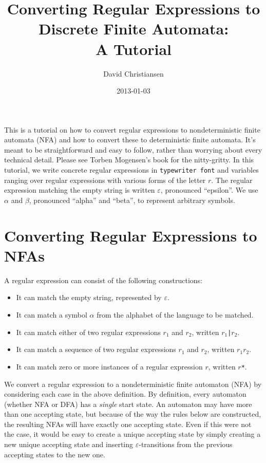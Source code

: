 \documentclass[a4paper]{article}
\title{Converting Regular Expressions to\\ Discrete Finite Automata:\\ A Tutorial}
\author{David Christiansen}
\date{2013-01-03}
\newcommand\eps{\ensuremath{\varepsilon}}
\newcommand{\regex}[1]{\texttt{#1}}
\begin{document}
\maketitle
This is a tutorial on how to convert regular expressions to nondeterministic
finite automata (NFA) and how to convert these to deterministic finite
automata. It's meant to be straightforward and easy to follow, rather than
worrying about every technical detail. Please see Torben Mogensen's book for
the nitty-gritty. In this tutorial, we write concrete regular expressions in
\regex{typewriter font} and variables ranging over regular expressions with
various forms of the letter $r$. The regular expression matching the empty
string is written \eps, pronounced ``epsilon''.  We use $\alpha$ and $\beta$,
pronounced ``alpha'' and ``beta'', to represent arbitrary symbols.


\section*{Converting Regular Expressions to NFAs}
\label{sec:conv-regul-expr}

A regular expression can consist of the following constructions:
\begin{itemize}
\item It can match the empty string, represented by \eps.
\item It can match a symbol $\alpha$ from the alphabet of the language to be matched.
\item It can match either of two regular expressions $r_1$ and $r_2$,
  written \regex{$r_1$|$r_2$}.
\item It can match a sequence of two regular expressions  $r_1$ and $r_2$,
  written \regex{$r_1$$r_2$}.
\item It can match zero or more instances of a regular expression
  $r$, written \regex{$r$*}.
\end{itemize}

We convert a regular expression to a nondeterministic finite automaton
(NFA) by considering each case in the above definition. By definition,
every automaton (whether NFA or DFA) has a \emph{single} start
state. An automaton may have more than one accepting state, but
because of the way the rules below are constructed, the resulting NFAs
will have exactly one accepting state.  Even if this were not the
case, it would be easy to create a unique accepting state by simply
creating a new unique accepting state and inserting \eps-transitions
from the previous accepting states to the new one.
\end{document}

